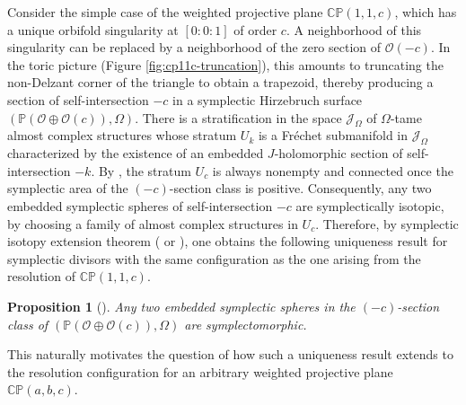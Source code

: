 \documentclass[11pt]{article}
\newtheorem{proposition}[theorem]{Proposition}
\theoremstyle{definition}
\theoremstyle{remark}
\newcommand{\CP}{\mathbb{CP}}
\begin{document}
Consider the simple case of the weighted projective plane $\CP(1,1,c)$, which has a unique orbifold singularity at $[0:0:1]$ of order $c$. A neighborhood of this singularity can be replaced by a neighborhood of the zero section of $\mathcal{O}(-c)$. In the toric picture (Figure \ref{fig:cp11c-truncation}), this amounts to truncating the non-Delzant corner of the triangle to obtain a trapezoid, thereby producing a section of self-intersection $-c$ in a symplectic Hirzebruch surface $(\mathbb{P}(\mathcal{O}\oplus\mathcal{O}(c)),\Omega)$. There is a stratification in the space $\mathcal{J}_{\Omega}$ of $\Omega$-tame almost complex structures whose stratum $U_k$ is a Fr\'{e}chet submanifold in $\mathcal{J}_{\Omega}$ characterized by the existence of an embedded $J$-holomorphic section of self-intersection $-k$. By \cite[Proposition 2.1, Corollary 2.8]{AbreuMcDuff}, the stratum $U_{c}$ is always nonempty and connected once the symplectic area of the $(-c)$-section class is positive. Consequently, any two embedded symplectic spheres of self-intersection $-c$ are symplectically isotopic, by choosing a family of almost complex structures in $U_{c}$. Therefore, by symplectic isotopy extension theorem (\cite[Proposition 4]{Auroux} or \cite[Proposition 0.2]{SiebertTian}), one obtains the following uniqueness result for symplectic divisors with the same configuration as the one arising from the resolution of $\CP(1,1,c)$.
\begin{proposition}[\cite{AbreuMcDuff}]\label{prop:AbreuMcDuff}
 Any two embedded symplectic spheres in the $(-c)$-section class of $(\mathbb{P}(\mathcal{O}\oplus\mathcal{O}(c)),\Omega)$ are symplectomorphic.
\end{proposition}
 This naturally motivates the question of how such a uniqueness result extends to the resolution configuration for an arbitrary weighted projective plane $\CP(a,b,c)$.
\end{document}
